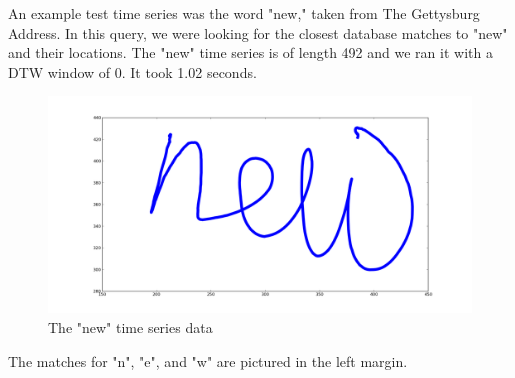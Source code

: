 An example test time series was the word "new," taken from The Gettysburg Address. In this query, we were looking for the closest database matches to "new" and their locations. The "new" time series is of length 492 and we ran it with a DTW window of 0. It took 1.02 seconds.
\\
\begin{figure}
    \includegraphics[width=\columnwidth]{images/new-1.png}
    \caption{The "new" time series data}
    \label{fig:teaser}
\end{figure}

The matches for "n", "e", and "w" are pictured in the left margin.
\\

